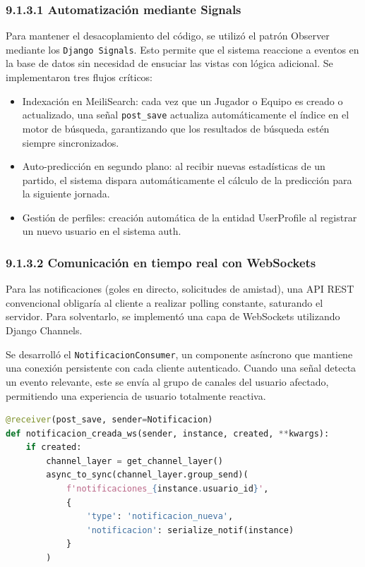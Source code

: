\subsubsection{9.1.3.1 Automatización mediante Signals}
 
Para mantener el desacoplamiento del código, se utilizó el patrón Observer mediante los \texttt{Django Signals}. Esto permite que el sistema reaccione a
eventos en la base de datos sin necesidad de ensuciar las vistas con lógica adicional. Se implementaron tres flujos críticos:
 
\begin{itemize}
\item Indexación en MeiliSearch: cada vez que un Jugador o Equipo es creado o actualizado, una señal \texttt{post\_save} actualiza automáticamente el índice en el motor de búsqueda, garantizando que los resultados de búsqueda estén siempre sincronizados.
\item Auto-predicción en segundo plano: al recibir nuevas estadísticas de un partido, el sistema dispara automáticamente el cálculo de la predicción para la siguiente jornada.
\item Gestión de perfiles: creación automática de la entidad UserProfile al registrar un nuevo usuario en el sistema auth.
\end{itemize}
 
\subsubsection{9.1.3.2 Comunicación en tiempo real con WebSockets}
 
Para las notificaciones (goles en directo, solicitudes de amistad), una API REST convencional obligaría al cliente a realizar polling constante,
saturando el servidor. Para solventarlo, se implementó una capa de WebSockets utilizando Django Channels.
 
Se desarrolló el \texttt{NotificacionConsumer}, un componente asíncrono que
mantiene una conexión persistente con cada cliente autenticado. Cuando una
señal detecta un evento relevante, este se envía al grupo de canales del
usuario afectado, permitiendo una experiencia de usuario totalmente reactiva.
 
\begin{lstlisting}[language=Python,caption={Signal de Django para emitir notificaciones en tiempo real vía WebSockets}]
@receiver(post_save, sender=Notificacion)
def notificacion_creada_ws(sender, instance, created, **kwargs):
    if created:
        channel_layer = get_channel_layer()
        async_to_sync(channel_layer.group_send)(
            f'notificaciones_{instance.usuario_id}',
            {
                'type': 'notificacion_nueva',
                'notificacion': serialize_notif(instance)
            }
        )
\end{lstlisting}
 
